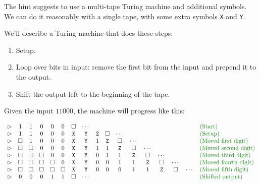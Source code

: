 \documentclass[12pt]{extarticle}
\begin{document}

The hint suggests to use a multi-tape Turing machine and additional symbols.
We can do it reasonably with a single tape, with some extra symbols \texttt{X} and \texttt{Y}.

We'll describe a Turing machine that does these steps:
\begin{enumerate}
    \item Setup.
    \item Loop over bits in input: remove the first bit from the input and prepend it to the output.
    \item Shift the output left to the beginning of the tape.
\end{enumerate}

Given the input $11000$, the machine will progress like this:

\[
\begin{array}{c c c c c c c c c c c c c c c c l}
\vartriangleright & 1 & 1 & 0 & 0 & 0 & \square & \cdots & & & & & & & & & \expl{Start}\\
\vartriangleright & 1 & 1 & 0 & 0 & 0 & \texttt{X} & \texttt{Y} & \texttt{Z} & \square & \cdots & & & & & & \expl{Setup}\\
\vartriangleright & \square & 1 & 0 & 0 & 0 & \texttt{X} & \texttt{Y} & 1 & \texttt{Z} & \square & \cdots & & & & & \expl{Moved first digit}\\
\vartriangleright & \square & \square & 0 & 0 & 0 & \texttt{X} & \texttt{Y} & 1 & 1 & \texttt{Z} & \square & \cdots & & & & \expl{Moved second digit}\\
\vartriangleright & \square & \square & \square & 0 & 0 & \texttt{X} & \texttt{Y} & 0 & 1 & 1 & \texttt{Z} & \square & \cdots & & & \expl{Moved third digit}\\
\vartriangleright & \square & \square & \square & \square & 0 & \texttt{X} & \texttt{Y} & 0 & 0 & 1 & 1 & \texttt{Z} & \square & \cdots & & \expl{Moved fourth digit}\\
\vartriangleright & \square & \square & \square & \square & \square & \texttt{X} & \texttt{Y} & 0 & 0 & 0 & 1 & 1 & \texttt{Z} & \square & \cdots & \expl{Moved fifth digit}\\
\vartriangleright & 0 & 0 & 0 & 1 & 1 & \square & \cdots & & & & & & & & & \expl{Shifted output}\\
\end{array}
\]
\end{document}
